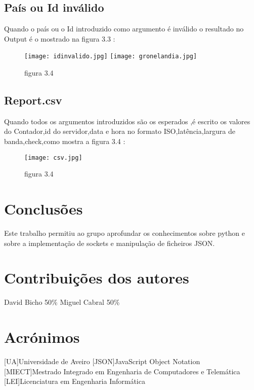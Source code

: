 \documentclass{report}
\begin{document}
\section{País ou Id inválido}
Quando o país ou o Id introduzido como argumento é inválido o resultado no Output é o mostrado na figura 3.3 :
\begin{figure}
    \centering
    \texttt{[image: idinvalido.jpg]}\newline
    \texttt{[image: gronelandia.jpg]}
    \caption{figura 3.4}
    \label{fig:my_label}
\end{figure}
\section{Report.csv}
Quando todos os argumentos introduzidos são os esperados ,é escrito os valores do Contador,id do servidor,data e hora no formato ISO,latência,largura de banda,check,como mostra a figura 3.4 :
\begin{figure}
    \centering
    \texttt{[image: csv.jpg]}
    \caption{figura 3.4}
    \label{fig:my_label}
\end{figure}
\chapter{Conclusões}
\label{chap.conclusao}
Este trabalho permitiu ao grupo aprofundar os conhecimentos sobre python e sobre a implementação de sockets e manipulação de ficheiros \ac{JSON}.

\chapter*{Contribuições dos autores}
David Bicho 50\%
Miguel Cabral 50\%

\chapter*{Acrónimos}
\begin{acronym}
[UA]{Universidade de Aveiro}
[JSON]{JavaScript Object Notation}
[MIECT]{Mestrado Integrado em Engenharia de Computadores e Telemática}
[LEI]{Licenciatura em Engenharia Informática}
\end{acronym}


\end{document}
